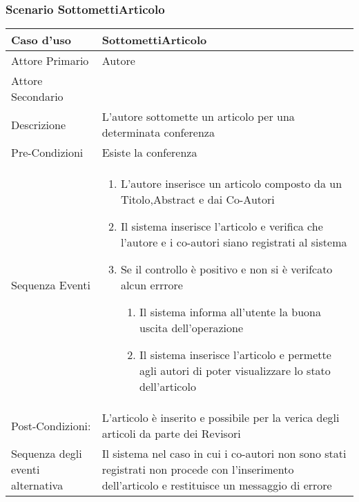\subsubsection{Scenario SottomettiArticolo}
\begin{tabular}{|p{3cm}|p{7cm}|}
\hline 
\rowcolor{Orchid}
Caso d'uso & SottomettiArticolo \\
\hline
  Attore Primario & Autore\\
  \hline
  Attore Secondario & \\
\hline
Descrizione & L'autore sottomette un articolo per una determinata conferenza\\
\hline
Pre-Condizioni& Esiste la conferenza\\
\hline
  Sequenza Eventi &
                    \begin{enumerate}
                    \item L'autore inserisce un articolo composto da un Titolo,Abstract e dai Co-Autori
                    \item Il sistema inserisce l'articolo e verifica che l'autore e i co-autori siano registrati al sistema
                    \item Se il controllo è positivo e non si è verifcato alcun errrore
                      \begin{enumerate}
                      \item Il sistema informa all'utente la buona uscita dell'operazione
                      \item Il sistema inserisce l'articolo e permette agli autori di poter visualizzare lo stato dell'articolo
                      \end{enumerate}
                    \end{enumerate} \\
\hline
Post-Condizioni: &L'articolo è inserito e possibile per la verica degli articoli da parte dei Revisori\\
\hline
Sequenza degli eventi alternativa & Il sistema nel caso in cui i co-autori non sono stati registrati non procede con l'inserimento dell'articolo e restituisce un messaggio di errore\\
\hline
\end{tabular}


